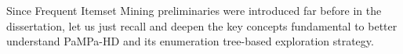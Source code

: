 %
%
%
Since Frequent Itemset Mining preliminaries were introduced far before in the dissertation,
let us just recall and deepen the key concepts fundamental to better understand PaMPa-HD and its
enumeration tree-based exploration strategy.

